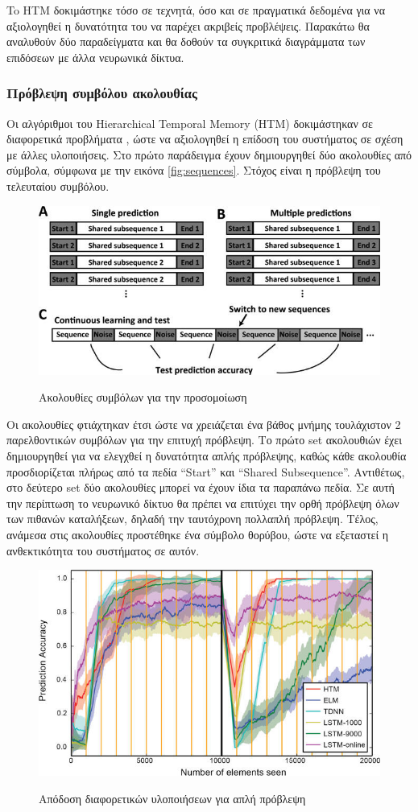 To ΗΤΜ δοκιμάστηκε τόσο σε τεχνητά, όσο και σε πραγματικά δεδομένα για να αξιολογηθεί η δυνατότητα του να παρέχει ακριβείς προβλέψεις.
Παρακάτω θα αναλυθούν δύο παραδείγματα και θα δοθούν τα συγκριτικά διαγράμματα των επιδόσεων με άλλα νευρωνικά δίκτυα.

\subsubsection{Πρόβλεψη συμβόλου ακολουθίας}

Οι αλγόριθμοι του Hierarchical Temporal Memory (HTM) δοκιμάστηκαν σε διαφορετικά προβλήματα \cite{continuous,nab}, ώστε να αξιολογηθεί η επίδοση του συστήματος σε σχέση με άλλες υλοποιήσεις.
Στο πρώτο παράδειγμα έχουν δημιουργηθεί δύο ακολουθίες από σύμβολα, σύμφωνα με την εικόνα \eqref{fig:sequences}.
Στόχος είναι η πρόβλεψη του τελευταίου συμβόλου.
\begin{figure}[H]
	\centering%
	{\includegraphics[width=0.8\columnwidth,clip=true]{figures/vlsi/sequences.jpg}}
	\caption{Ακολουθίες συμβόλων για την προσομοίωση} \label{fig:sequences}
\end{figure}

Οι ακολουθίες φτιάχτηκαν έτσι ώστε να χρειάζεται ένα βάθος μνήμης τουλάχιστον 2 παρελθοντικών συμβόλων για την επιτυχή πρόβλεψη.
Το πρώτο set ακολουθιών έχει δημιουργηθεί για να ελεγχθεί η δυνατότητα απλής πρόβλεψης, καθώς κάθε ακολουθία προσδιορίζεται πλήρως από τα πεδία ``Start'' και ``Shared Subsequence''.
Αντιθέτως, στο δεύτερο set δύο ακολουθίες μπορεί να έχουν ίδια τα παραπάνω πεδία.
Σε αυτή την περίπτωση το νευρωνικό δίκτυο θα πρέπει να επιτύχει την ορθή πρόβλεψη όλων των πιθανών καταλήξεων, δηλαδή την ταυτόχρονη πολλαπλή πρόβλεψη.
Τέλος, ανάμεσα στις ακολουθίες προστέθηκε ένα σύμβολο θορύβου, ώστε να εξεταστεί η ανθεκτικότητα του συστήματος σε αυτόν.
\begin{figure}[H]
	\centering%
	{\includegraphics[width=0.7\columnwidth,clip=true]{figures/vlsi/single_prediction.jpg}}
	\caption{Απόδοση διαφορετικών υλοποιήσεων για απλή πρόβλεψη} \label{fig:single-prediction}
\end{figure}

